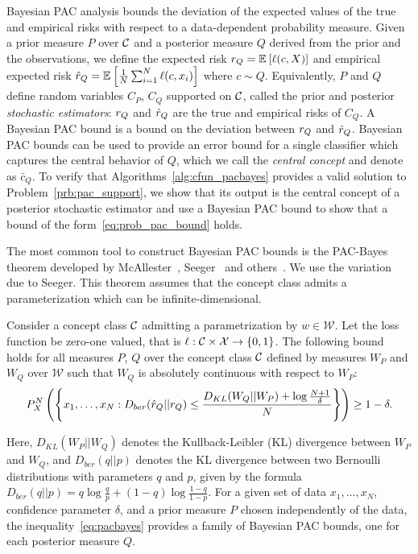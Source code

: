 \documentclass[onefignum,onetabnum]{siamart171218}
\begin{document}
Bayesian PAC analysis bounds the deviation of
the expected values of the true and empirical risks with respect to a
data-dependent probability measure. 
Given a
prior measure $P$ over $\mathcal{C}$ and a posterior measure $Q$ derived from the
prior and the observations, we define the expected risk $r_{Q} = \mathbb{E}_{ }\left[\ell(c, X)\right]$ and
empirical expected risk $\hat{r}_{Q}=\mathbb{E}_{ }\left[\frac{1}{N}\sum_{i=1}^N \ell(c, x_i)\right]$
where $c\sim Q$.
Equivalently, $P$ and $Q$ define random variables $C_P$, $C_Q$ supported on
$\mathcal{C}$, called the
prior and posterior \emph{stochastic estimators}: $r_{Q}$ and $\hat{r}_{Q}$ are the
true and empirical risks of $C_Q$.
A Bayesian PAC bound is a bound on the deviation between $r_{Q}$ and $\hat{r}_{Q}$.
Bayesian PAC bounds can be used to provide an error bound for a
single classifier which captures the central behavior of $Q$, which we call the
\emph{central concept} and denote as $\bar{c}_Q$. 
To verify that Algorithms~\ref{alg:cfun_pacbayes}
provides a valid solution to
Problem~\ref{prb:pac_support}, we show that 
its output is the central concept of a posterior stochastic estimator and use a
Bayesian PAC bound to show that a bound of the 
form~\eqref{eq:prob_pac_bound} holds.

The most common tool to construct Bayesian PAC bounds is the
PAC-Bayes theorem developed by McAllester~\cite{mcallester1999some}, 
Seeger~\cite{seeger2002pac} and others~\cite{langford2005tutorial}. 
We use the variation due to Seeger. 
This theorem assumes that the concept class 
admits a parameterization which can be infinite-dimensional.
\begin{theorem}
    \label{thm:pacbayes}
    Consider a concept class $\mathcal{C}$ admitting a parametrization by
    $w\in\mathcal{W}$.
    Let the loss function be zero-one valued, that is
    $\ell:\mathcal{C}\times\mathcal{X}\to\{0,1\}$.
    The following bound holds for all measures $P$, $Q$ over the concept class $\mathcal{C}$
    defined by measures $W_P$ and $W_Q$ over $\mathcal{W}$
    such that $W_Q$ is absolutely continuous with respect to $W_P$:
    \begin{equation}
        \label{eq:pacbayes}
        P_X^N\left( \left\{x_1,\dotsc,x_N:
            D_{ber}(\hat{r}_{Q} || r_{Q}) 
            \le 
            \frac{
                D_{KL}(W_Q || W_P) + \log\frac{N+1}{\delta}
            }{N}
        \right\}\right) \ge 1 - \delta.
    \end{equation}
\end{theorem}
Here, $D_{KL}(W_P||W_Q)$ denotes the Kullback-Leibler (KL) divergence between
$W_P$ and $W_Q$, and $D_{ber}(q||p)$ denotes the KL divergence between two
Bernoulli distributions with parameters $q$ and $p$, given by the formula
$D_{ber}(q||p) = q\log\frac{q}{p} + (1-q)\log\frac{1-q}{1-p}$.
For a given set of data $x_1,\dotsc,x_N$, confidence parameter $\delta$, 
and a prior measure $P$ chosen independently of the data, 
the inequality~\eqref{eq:pacbayes} provides a family of Bayesian PAC bounds, one
for each posterior measure $Q$.
\end{document}
